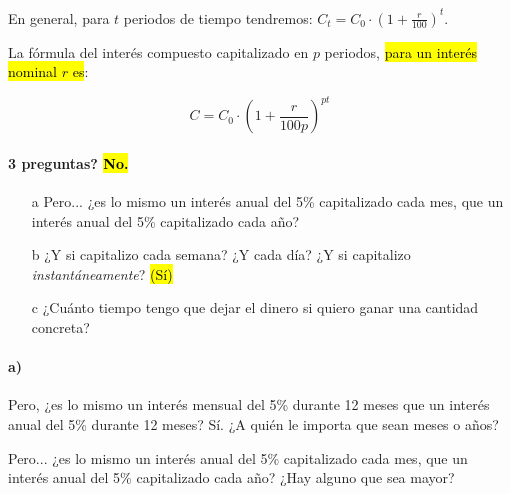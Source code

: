 \documentclass[palatino,nosec]{Docencia}
\begin{document}
En general, para $t$ periodos de tiempo tendremos: $C_t = C_0·\left(1+\frac{r}{100}\right)^t$.

La fórmula del interés compuesto capitalizado en $p$ periodos, \hl{para un interés nominal $r$ es}: 

\[C = C_0·\left(1+\frac{r}{100p}\right)^{pt}\]


\paragraph{3 preguntas? \hl{No.}}
\begin{itemize}
	\item[a] Pero... ¿es lo mismo un interés anual del 5\% capitalizado cada mes, que un interés anual del 5\% capitalizado cada año?

	\item[b] ¿Y si capitalizo cada semana? ¿Y cada día? ¿Y si capitalizo \textit{instantáneamente}? \hl{(Sí)}

	\item[c] ¿Cuánto tiempo tengo que dejar el dinero si quiero ganar una cantidad concreta?
\end{itemize}

\paragraph{a)}
Pero, ¿es lo mismo un interés mensual del 5\% durante 12 meses que un interés anual del 5\% durante 12 meses? Sí. ¿A quién le importa que sean meses o años?

Pero... ¿es lo mismo un interés anual del 5\% capitalizado cada mes, que un interés anual del 5\% capitalizado cada año? ¿Hay alguno que sea mayor? 
\end{document}
